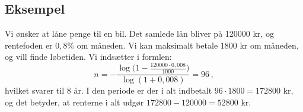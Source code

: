 \documentclass[12pt,oneside,a4paper]{article}
\begin{document}
\begin{tcolorbox}
\subsection*{Eksempel}
Vi ønsker at låne penge til en bil. Det samlede lån bliver på 120000 kr, og
rentefoden er $0,8\%$ om måneden. Vi kan maksimalt betale 1800 kr om
måneden, og vill finde løbetiden.  Vi indsætter i formlen:
\[
n = -\frac{\log\big(1-\frac{120000\cdot0,008}{1000}\big)}{\log(1+0,008)} = 96 \,,
\]
hvilket svarer til 8 år.
I den periode er der i alt indbetalt $96\cdot 1800 = 172800$ kr, og det betyder,
at renterne i alt udgør $172800-120000 = 52800$ kr.
\end{tcolorbox}
\end{document}

